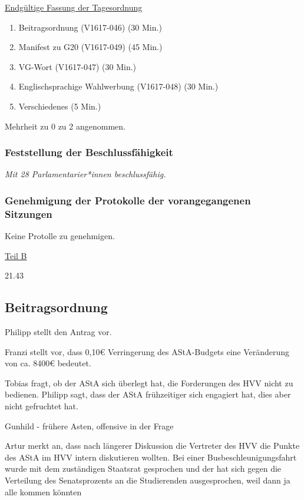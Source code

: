 \documentclass[ngerman,headheight=70pt]{scrartcl}
\begin{document}
    \newpage
    \underline{Endgültige Fassung der Tagesordnung}
    \begin{enumerate}[label={\textbf{Top \theenumi}},leftmargin=*]
        \item Beitragsordnung (V1617-046) (30 Min.)
        \item Manifest zu G20 (V1617-049) (45 Min.)
        \item VG-Wort (V1617-047) (30 Min.)
        \item Englischsprachige Wahlwerbung (V1617-048) (30 Min.)
        \item Verschiedenes (5 Min.)
    \end{enumerate}

    Mehrheit zu 0 zu 2 angenommen.

    \subsubsection{Feststellung der Beschlussfähigkeit}

    \textit{Mit 28 Parlamentarier*innen beschlussfähig.}

    \subsubsection{Genehmigung der Protokolle der vorangegangenen Sitzungen}

    Keine Protolle zu genehmigen.

    \vspace{0.5cm}
    {\Large \underline{Teil B}}

    21.43

    \subsection{Beitragsordnung}

    Philipp stellt den Antrag vor.

    Franzi stellt vor, dass 0,10€ Verringerung des AStA-Budgets eine Veränderung
    von ca. 8400€ bedeutet.

    Tobias fragt, ob der AStA sich überlegt hat, die Forderungen des HVV nicht
    zu bedienen. Philipp sagt, dass der AStA frühzeitiger sich engagiert hat,
    dies aber nicht gefruchtet hat.

    Gunhild - frühere Asten, offensive in der Frage

    Artur merkt an, dass nach längerer Diskussion die Vertreter des HVV die
    Punkte des AStA im HVV intern diskutieren wollten. Bei einer Busbeschleunigungsfahrt
    wurde mit dem zuständigen Staatsrat gesprochen und der hat sich gegen die Verteilung
    des Senatsprozents an die Studierenden ausgesprochen, weil dann ja alle kommen
    könnten
\end{document}
